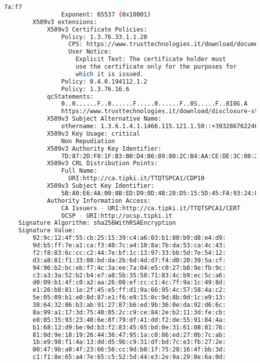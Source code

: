 \documentclass{article}
\begin{document}
\begin{lstlisting}[language=bash]
                    7a:f7
                Exponent: 65537 (0x10001)
        X509v3 extensions:
            X509v3 Certificate Policies: 
                Policy: 1.3.76.33.1.1.20
                  CPS: https://www.trusttechnologies.it/download/documentazione/
                  User Notice:
                    Explicit Text: The certificate holder must 
                    use the certificate only for the purposes for 
                    which it is issued.
                Policy: 0.4.0.194112.1.2
                Policy: 1.3.76.16.6
            qcStatements: 
                0..0......F..0......F.....0......F..0S.....F..0I0G.A
                https://www.trusttechnologies.it/download/disclosure-statement-qc..EN0......F..0......F...
            X509v3 Subject Alternative Name: 
                othername: 1.3.6.1.4.1.1466.115.121.1.50::+393286762246
            X509v3 Key Usage: critical
                Non Repudiation
            X509v3 Authority Key Identifier: 
                7D:87:2D:F8:1F:B3:B0:D4:B6:89:80:2C:B4:AA:CE:DE:3C:08:22:06
            X509v3 CRL Distribution Points: 
                Full Name:
                  URI:http://ca.tipki.it/TTQTSPCA1/CDP10
            X509v3 Subject Key Identifier: 
                5B:A0:E6:4A:00:8B:ED:D9:0D:4B:28:D5:15:5D:45:FA:93:24:80:17
            Authority Information Access: 
                CA Issuers - URI:http://ca.tipki.it/TTQTSPCA1/CERT
                OCSP - URI:http://ocsp.tipki.it
    Signature Algorithm: sha256WithRSAEncryption
    Signature Value:
        92:9c:12:4f:55:cb:25:15:39:c4:a6:03:b1:80:b9:d8:e4:d9:
        9d:b5:ff:7e:a1:ca:f3:40:7c:a4:10:8a:7b:da:53:ca:4c:43:
        f2:f8:83:6c:cc:c2:44:7e:bf:1c:13:97:33:bb:5d:7e:54:12:
        d3:a8:81:f1:33:08:bd:da:2b:6d:4d:d7:f4:d0:20:39:5a:cf:
        94:96:b2:bc:eb:f7:4c:3a:ee:7a:04:e5:c0:27:b8:9e:fb:9c:
        c3:a3:3a:52:b2:b4:e7:a8:5b:35:58:71:83:4c:b9:ec:5c:a6:
        d0:09:b1:4f:c0:a2:aa:26:08:ef:cc:c1:4c:7f:9a:1c:49:8d:
        e1:26:b8:81:1e:2f:45:e5:ff:d1:9a:66:95:4c:57:58:4a:c2:
        5e:05:09:b1:e0:8d:87:e1:f6:e9:15:0c:9d:8b:0d:1c:e9:13:
        38:64:32:86:b3:ab:91:27:87:b6:ed:9b:36:0e:da:92:d6:6c:
        8a:99:a1:17:3d:75:40:05:2c:c9:ce:84:2e:b2:11:3d:fe:cb:
        e8:05:35:93:23:40:6e:8f:79:df:41:dd:f2:de:55:91:84:4a:
        b1:68:12:d9:be:9d:b3:f2:83:45:65:bd:0e:31:61:08:81:76:
        81:0d:9e:18:19:26:44:36:47:95:1a:c0:86:ed:27:0b:7c:ab:
        1b:e9:98:f1:4a:13:dd:d5:9b:c9:31:df:bd:7c:e3:fb:27:2e:
        00:47:9b:a0:4f:23:66:56:cc:9d:b0:1f:75:20:16:4f:bb:3d:
        c1:f1:8e:65:a4:7e:65:c5:52:5d:44:e3:2e:9a:29:8e:6a:0d:

\end{lstlisting}
\end{document}
